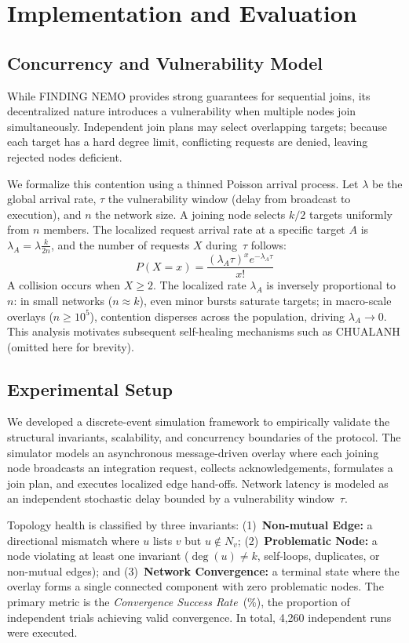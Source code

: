 \documentclass[runningheads]{llncs}
\begin{document}
\section{Implementation and Evaluation}
\label{sec:implementation}

\subsection{Concurrency and Vulnerability Model}
\label{subsec:concurrency_model}
While FINDING NEMO provides strong guarantees for sequential joins, its decentralized nature introduces a vulnerability when multiple nodes join simultaneously. Independent join plans may select overlapping targets; because each target has a hard degree limit, conflicting requests are denied, leaving rejected nodes deficient.

We formalize this contention using a thinned Poisson arrival process. Let $\lambda$ be the global arrival rate, $\tau$ the vulnerability window (delay from broadcast to execution), and $n$ the network size. A joining node selects $k/2$ targets uniformly from $n$ members. The localized request arrival rate at a specific target $A$ is $\lambda_A = \lambda \frac{k}{2n}$, and the number of requests $X$ during~$\tau$ follows:
$$P(X = x) = \frac{(\lambda_A \tau)^x e^{-\lambda_A \tau}}{x!}$$
A collision occurs when $X \ge 2$. The localized rate $\lambda_A$ is inversely proportional to~$n$: in small networks ($n \approx k$), even minor bursts saturate targets; in macro-scale overlays ($n \ge 10^5$), contention disperses across the population, driving $\lambda_A \to 0$. This analysis motivates subsequent self-healing mechanisms such as CHUALANH (omitted here for brevity).

\subsection{Experimental Setup}
\label{subsec:sim_setup}
We developed a discrete-event simulation framework to empirically validate the structural invariants, scalability, and concurrency boundaries of the protocol. The simulator models an asynchronous message-driven overlay where each joining node broadcasts an integration request, collects acknowledgements, formulates a join plan, and executes localized edge hand-offs. Network latency is modeled as an independent stochastic delay bounded by a vulnerability window~$\tau$.

Topology health is classified by three invariants:
(1)~\textbf{Non-mutual Edge:} a directional mismatch where $u$ lists $v$ but $u \notin N_v$;
(2)~\textbf{Problematic Node:} a node violating at least one invariant ($\deg(u) \neq k$, self-loops, duplicates, or non-mutual edges); and
(3)~\textbf{Network Convergence:} a terminal state where the overlay forms a single connected component with zero problematic nodes.
The primary metric is the \textit{Convergence Success Rate}~(\%), the proportion of independent trials achieving valid convergence. In total, 4{,}260 independent runs were executed.
\end{document}
